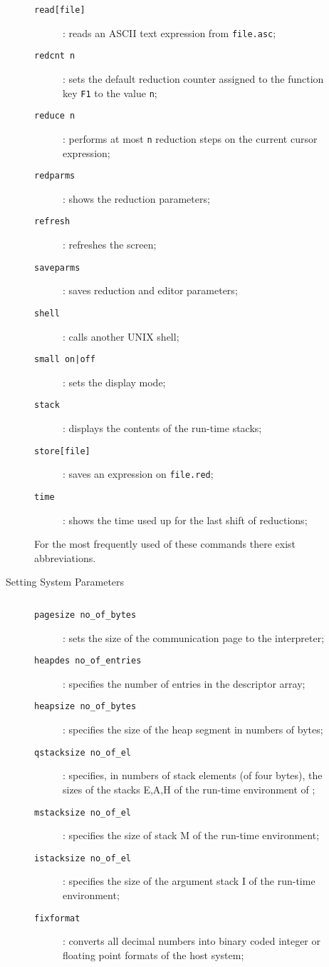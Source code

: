 \begin{description}
\begin{description}
\begin{description}
\item[{\tt read[file]}]: reads an ASCII text expression from {\tt file.asc};
\item[{\tt redcnt n}]: sets the default reduction counter assigned to
 the function key {\tt F1} to the value {\tt n};
\item[{\tt reduce n}]: performs at most {\tt n} reduction steps on the
current cursor expression;
\item[{\tt redparms}]: shows the reduction parameters;
\item[{\tt refresh}]: refreshes the screen;
\item[{\tt saveparms}]: saves reduction and editor parameters;
\item[{\tt shell}]: calls another UNIX shell;
\item[{\tt small on|off}]: sets the display mode;
\item[{\tt stack}]: displays the contents of the \pired run-time stacks;
\item[{\tt store[file]}]: saves an expression on {\tt file.red};
\item[{\tt time}]: shows the time used up for the last shift of
reductions;
\end{description}
For the most frequently used of these commands there exist abbreviations.
\\
\item[{\rm Setting System Parameters}]$\;$\\ 
\begin{description}
\item[{\tt pagesize no\_of\_bytes}]: sets the size of the communication page
to the \pired interpreter;
\item[{\tt heapdes no\_of\_entries}]: specifies the number of entries in
the descriptor array;
\item[{\tt heapsize no\_of\_bytes}]: specifies the size of the heap segment in numbers of bytes;
\item[{\tt qstacksize no\_of\_el}]:  specifies, in numbers of stack elements (of four bytes), the sizes of the stacks E,A,H of the run-time
environment of \pired;
\item[{\tt mstacksize no\_of\_el}]: specifies the size of stack M of
the
run-time environment;
\item[{\tt istacksize no\_of\_el}]: specifies the size of the argument
stack I of the run-time environment;
\item[{\tt fixformat}]: converts all decimal numbers into binary coded
integer or floating point formats of the host system;

\end{description}
\end{description}
\end{description}
